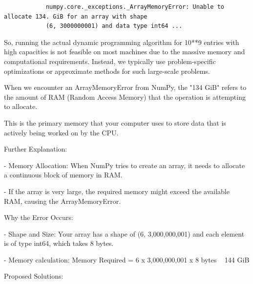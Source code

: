 \documentclass{article}%
\begin{document}
            \begin{verbatim}
            numpy.core._exceptions._ArrayMemoryError: Unable to allocate 134. GiB for an array with shape 
            (6, 3000000001) and data type int64 ...
            \end{verbatim}

            So, running the actual dynamic programming algorithm for 10**9 entries with high capacities is not feasible on most machines 
            due to the massive memory and computational requirements. Instead, we typically use problem-specific optimizations or approximate methods for such large-scale problems.

            When we encounter an ArrayMemoryError from NumPy, the "134 GiB" refers to the amount of RAM (Random Access Memory) that the operation is attempting to allocate. 
            
            This is the primary memory that your computer uses to store data that is actively being worked on by the CPU.
\vspace{2cm}
            
            
            Further Explanation:

                        
\vspace{0.3cm}


            - Memory Allocation: When NumPy tries to create an array, it needs to allocate a continuous block of memory in RAM. 
                        
            - If the array is very large, the required memory might exceed the available RAM, causing the ArrayMemoryError.
\vspace{2cm}
            
                        
                        
            Why the Error Occurs:

                        
\vspace{0.3cm}

                        
            - Shape and Size: Your array has a shape of (6, 3,000,000,001) and each element is of type int64, which takes 8 bytes.  
                         
            - Memory calculation: Memory Required = 6 x 3,000,000,001 x 8 bytes ~ 144 GiB
\vspace{2cm}
            
                        
                        
           Proposed Solutions:
\end{document}
